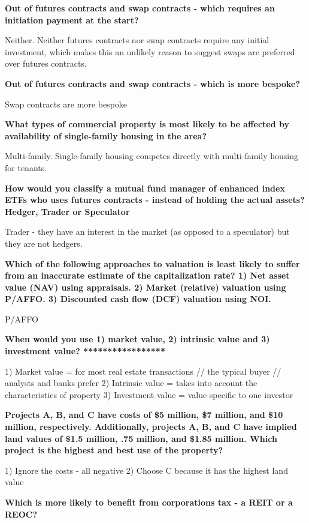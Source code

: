 \documentclass[12pt]{article}
\begin{document}
\begin{framed}
\textbf{Out of futures contracts and swap contracts - which requires an initiation payment at the start?}

Neither. Neither futures contracts nor swap contracts require any initial investment, which makes this an unlikely reason to suggest swaps are preferred over futures contracts.

\textbf{Out of futures contracts and swap contracts - which is more bespoke?}

Swap contracts are more bespoke

\textbf{What types of commercial property is most likely to be affected by availability of single-family housing in the area?}

Multi-family. Single-family housing competes directly with multi-family housing for tenants.


\begin{framed}
	
\textbf{How would you classify a mutual fund manager of enhanced index ETFs who uses futures contracts - instead of holding the actual assets? Hedger, Trader or Speculator}

Trader - they have an interest in the market (as opposed to a speculator) but they are not hedgers. 

\textbf{Which of the following approaches to valuation is least likely to suffer from an inaccurate estimate of the capitalization rate? 1) Net asset value (NAV) using appraisals. 2) Market (relative) valuation using P/AFFO. 3) Discounted cash flow (DCF) valuation using NOI.}

P/AFFO


\textbf{When would you use 1) market value, 2) intrinsic value and 3) investment value? *****************}

1) Market value = for most real estate transactions // the typical buyer // analysts and banks prefer
2) Intrinsic value = takes into account the characteristics of property
3) Investment value = value specific to one investor

\textbf{Projects A, B, and C have costs of \$5 million, \$7 million, and \$10 million, respectively. Additionally, projects A, B, and C have implied land values of \$1.5 million, \1.75 million, and \$1.85 million. Which project is the highest and best use of the property?}

1) Ignore the costs - all negative
2) Choose C because it has the highest land value

\textbf{Which is more likely to benefit from corporations tax - a REIT or a REOC?}


\end{framed}
\end{framed}
\end{document}
